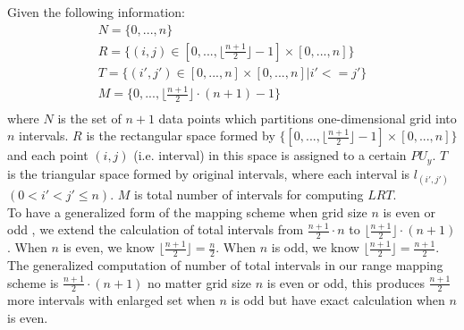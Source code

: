 \documentclass[AMA,LATO1COL]{WileyNJD-v2}
\begin{document}
Given the following information:
\begin{eqnarray}
& N = \{0,...,n\}               & \\
& R = \{(i,j)\in [0,...,\lfloor \frac{n+1}{2}\rfloor -1] \times [0,...,n]\}     &\\
& T = \{(i',j') \in [0,...,n] \times [0,...,n] | i'<=j'\}   &\\
& M = \{0,..., \lfloor \frac{n+1}{2}\rfloor \cdot (n+1)-1\}  &\\
\end{eqnarray}
where  $ N$ is the set of $n+1$ data points which partitions one-dimensional grid into $n$ intervals. $ R$ is the rectangular space formed by $\{[0,...,\lfloor \frac{n+1}{2}\rfloor -1]\times [0,...,n]\}$ and each point $(i,j)$ (i.e. interval) in this space is assigned to a certain $PU_y$. $T$ is the triangular space formed by original intervals, where each interval is $l_(i',j')$ $(0<i'<j'\leq n)$. $ M$ is total number of  intervals for computing $LRT$.\\
 To have a generalized form of the mapping scheme when grid size $n$ is even or odd , we extend the calculation of total intervals from $\frac{n+1}{2} \cdot n$ to $\lfloor \frac{n+1}{2}\rfloor \cdot (n+1)$. When $n$ is even, we know $\lfloor \frac{n+1}{2}\rfloor =\frac{n}{2}$. When $n$ is odd, we know $\lfloor \frac{n+1}{2}\rfloor= \frac{n+1}{2}$. The generalized computation of number of total intervals in our range mapping scheme is $\frac{n+1}{2} \cdot (n+1) $ no matter grid size $n$ is even or odd, this produces $\frac{n+1}{2}$ more intervals with enlarged set when $n$ is odd but have exact calculation when $n$ is even. \\
\end{document}
